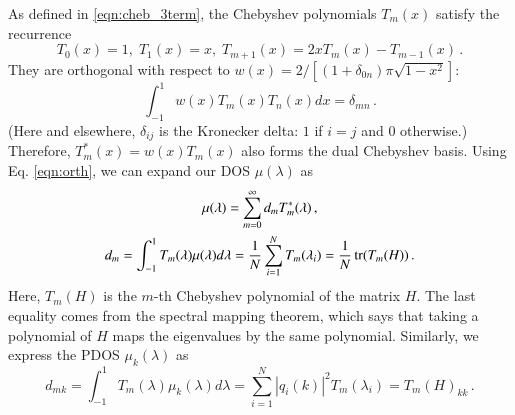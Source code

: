 As defined in \cref{eqn:cheb_3term}, the Chebyshev polynomials $T_m(x)$ satisfy
the recurrence
\begin{equation*}
	T_0(x) = 1,\; T_1(x) = x,\; T_{m+1}(x) = 2xT_m(x) - T_{m-1}(x)\,.
\end{equation*}
They are orthogonal with respect to $w(x) =  2 / \left[(1+\delta_{0n})\pi
\sqrt{1-x^2}\right]$:
\begin{equation} \label{eqn:orth}
	\int_{-1}^1 w(x)T_m(x)T_n(x)dx = \delta_{mn}\,.
\end{equation}
(Here and elsewhere, $\delta_{ij}$ is the Kronecker delta: $1$ if $i = j$ and
$0$ otherwise.) Therefore, $T_m^\ast(x) = w(x)T_m(x)$ also forms the dual
Chebyshev basis. Using Eq. \ref{eqn:orth}, we can expand our DOS $\mu(\lambda)$
as
\begin{gather} \label{eqn:doscoeff}
\mu(\lambda) = \sum_{m=0}^\infty d_mT^\ast_m(\lambda)\,, \\
d_m = \int_{-1}^1T_m(\lambda)\mu(\lambda)d\lambda = \frac{1}{N}\sum_{i=1}^N 
T_m(\lambda_i) = \frac{1}{N}\operatorname{tr}(T_m(H))\,.
\end{gather}
Here, $T_m(H)$ is the $m$\hyp{}th Chebyshev polynomial of the matrix $H$. The
last equality comes from the spectral mapping theorem, which says that taking a
polynomial of $H$ maps the eigenvalues by the same polynomial. Similarly, we
express the PDOS $\mu_k(\lambda)$ as
\begin{equation}\label{eqn:pdoscoeff}
	d_{mk} = \int_{-1}^1 T_m(\lambda)\mu_k(\lambda)d\lambda = \sum_{i=1}^N |q_i(k)|
	^2T_m(\lambda_i) = T_m(H)_{kk}\,.
\end{equation}

